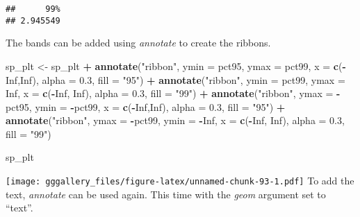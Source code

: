 \documentclass[]{book}
\newenvironment{Shaded}{\begin{snugshade}}{\end{snugshade}}
\newcommand{\DataTypeTok}[1]{\textcolor[rgb]{0.13,0.29,0.53}{#1}}
\newcommand{\FloatTok}[1]{\textcolor[rgb]{0.00,0.00,0.81}{#1}}
\newcommand{\KeywordTok}[1]{\textcolor[rgb]{0.13,0.29,0.53}{\textbf{#1}}}
\newcommand{\NormalTok}[1]{#1}
\newcommand{\OperatorTok}[1]{\textcolor[rgb]{0.81,0.36,0.00}{\textbf{#1}}}
\newcommand{\OtherTok}[1]{\textcolor[rgb]{0.56,0.35,0.01}{#1}}
\newcommand{\StringTok}[1]{\textcolor[rgb]{0.31,0.60,0.02}{#1}}
\begin{document}
\begin{verbatim}
##      99% 
## 2.945549
\end{verbatim}

The bands can be added using \emph{annotate} to create the ribbons.

\begin{Shaded}
\begin{Highlighting}[]
\NormalTok{sp_plt <-}\StringTok{ }\NormalTok{sp_plt }\OperatorTok{+}\StringTok{ }
\StringTok{  }\KeywordTok{annotate}\NormalTok{(}\StringTok{"ribbon"}\NormalTok{, }\DataTypeTok{ymin =}\NormalTok{ pct95, }\DataTypeTok{ymax =}\NormalTok{ pct99, }\DataTypeTok{x =} \KeywordTok{c}\NormalTok{(}\OperatorTok{-}\OtherTok{Inf}\NormalTok{,}\OtherTok{Inf}\NormalTok{), }\DataTypeTok{alpha =} \FloatTok{0.3}\NormalTok{, }\DataTypeTok{fill =} \StringTok{"95"}\NormalTok{) }\OperatorTok{+}
\StringTok{  }\KeywordTok{annotate}\NormalTok{(}\StringTok{"ribbon"}\NormalTok{, }\DataTypeTok{ymin =}\NormalTok{ pct99, }\DataTypeTok{ymax =} \OtherTok{Inf}\NormalTok{, }\DataTypeTok{x =} \KeywordTok{c}\NormalTok{(}\OperatorTok{-}\OtherTok{Inf}\NormalTok{, }\OtherTok{Inf}\NormalTok{), }\DataTypeTok{alpha =} \FloatTok{0.3}\NormalTok{, }\DataTypeTok{fill =} \StringTok{"99"}\NormalTok{) }\OperatorTok{+}\StringTok{ }
\StringTok{  }\KeywordTok{annotate}\NormalTok{(}\StringTok{"ribbon"}\NormalTok{, }\DataTypeTok{ymax =} \OperatorTok{-}\NormalTok{pct95, }\DataTypeTok{ymin =} \OperatorTok{-}\NormalTok{pct99, }\DataTypeTok{x =} \KeywordTok{c}\NormalTok{(}\OperatorTok{-}\OtherTok{Inf}\NormalTok{,}\OtherTok{Inf}\NormalTok{), }\DataTypeTok{alpha =} \FloatTok{0.3}\NormalTok{, }\DataTypeTok{fill =} \StringTok{"95"}\NormalTok{) }\OperatorTok{+}\StringTok{ }
\StringTok{  }\KeywordTok{annotate}\NormalTok{(}\StringTok{"ribbon"}\NormalTok{, }\DataTypeTok{ymax =} \OperatorTok{-}\NormalTok{pct99, }\DataTypeTok{ymin =} \OperatorTok{-}\OtherTok{Inf}\NormalTok{, }\DataTypeTok{x =} \KeywordTok{c}\NormalTok{(}\OperatorTok{-}\OtherTok{Inf}\NormalTok{, }\OtherTok{Inf}\NormalTok{), }\DataTypeTok{alpha =} \FloatTok{0.3}\NormalTok{, }\DataTypeTok{fill =} \StringTok{"99"}\NormalTok{) }

\NormalTok{sp_plt }
\end{Highlighting}
\end{Shaded}

\texttt{[image: gggallery\_files/figure-latex/unnamed-chunk-93-1.pdf]}
To add the text, \emph{annotate} can be used again. This time with the \emph{geom} argument set to ``text''.
\end{document}
